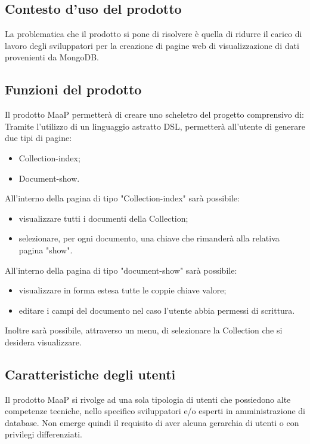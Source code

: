 \subsection{Contesto d'uso del prodotto} %
\label{2.1}
La problematica che il prodotto si pone di risolvere è quella di ridurre il carico di lavoro degli sviluppatori per la creazione di pagine web di visualizzazione di dati provenienti da MongoDB.
            
\subsection{Funzioni del prodotto} %
\label{2.2}
Il prodotto MaaP permetterà di creare uno scheletro del progetto comprensivo di:
Tramite l'utilizzo di un linguaggio astratto DSL, permetterà all'utente di generare due tipi di pagine:
\begin{itemize}
\item Collection-index;
\item Document-show.
\end{itemize}

All'interno della pagina di tipo "Collection-index" sarà possibile:
\begin{itemize}
\item visualizzare tutti i documenti della Collection;
\item selezionare, per ogni documento, una chiave che rimanderà alla relativa pagina "show".
\end{itemize}

All'interno della pagina di tipo "document-show" sarà possibile:
\begin{itemize}
\item visualizzare in forma estesa tutte le coppie chiave valore;
\item editare i campi del documento nel caso l'utente abbia permessi di scrittura.
\end{itemize}

Inoltre sarà possibile, attraverso un menu, di selezionare la Collection che si desidera visualizzare.

\subsection{Caratteristiche degli utenti}
\label{2.3}
Il prodotto MaaP si rivolge ad una sola tipologia di utenti che possiedono alte competenze tecniche, nello specifico sviluppatori e/o esperti in amministrazione di database.
Non emerge quindi il requisito di aver alcuna gerarchia di utenti o con privilegi differenziati.


